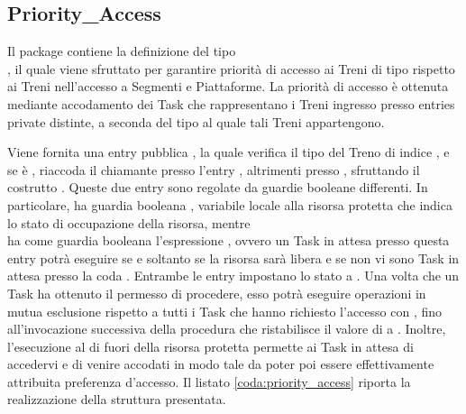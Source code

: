 	\subsection{Priority\_Access}\label{subsec:priority_access_controller}
	
	Il package  contiene la definizione del tipo  \\, il quale viene sfruttato per garantire priorità di accesso ai Treni di tipo  rispetto ai Treni  nell'accesso a Segmenti e Piattaforme. La priorità di accesso è ottenuta mediante accodamento dei Task che rappresentano i Treni ingresso presso entries private distinte, a seconda del tipo al quale tali Treni appartengono. 
	
	Viene fornita una entry pubblica , la quale verifica il tipo del Treno di indice , e se è , riaccoda il chiamante presso l'entry , altrimenti presso , sfruttando il costrutto . Queste due entry sono regolate da guardie booleane differenti. In particolare,  ha guardia booleana , variabile locale alla risorsa protetta che indica lo stato di occupazione della risorsa, mentre \\ ha come guardia booleana l'espressione , ovvero un Task in attesa presso questa entry potrà eseguire se e soltanto se la risorsa sarà libera e se non vi sono Task in attesa presso la coda . Entrambe le entry impostano lo stato  a . 
	Una volta che un Task ha ottenuto il permesso di procedere, esso potrà eseguire operazioni in mutua esclusione rispetto a tutti i Task che hanno richiesto l'accesso con , fino all'invocazione successiva della procedura  che ristabilisce il valore di  a . Inoltre, l'esecuzione al di fuori della risorsa protetta permette ai Task in attesa di accedervi e di venire accodati in modo tale da poter poi essere effettivamente attribuita preferenza d'accesso. Il listato \ref{coda:priority_access} riporta la realizzazione della struttura presentata.

